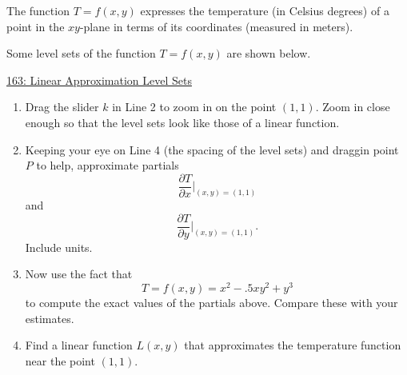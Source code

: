 \documentclass{ximera}
\begin{document}
\begin{question} \label{Q90f3mmrzx}
The function $T = f(x,y)$ expresses the temperature (in Celsius degrees) of a point in the $xy$-plane in terms of its coordinates (measured in meters).

Some level sets of the function $T=f(x,y)$ are shown below. 

\begin{onlineOnly}
    \begin{center}
\end{center}
\end{onlineOnly}

\href{https://www.desmos.com/calculator/lyquf7jmbb}{163: Linear Approximation Level Sets}

\begin{enumerate}
\item Drag the slider $k$ in Line 2 to zoom in on the point $(1,1)$. Zoom in close enough so that the level sets look like those of a linear function.

\item Keeping your eye on Line 4 (the spacing of the level sets) and draggin point $P$ to help, approximate partials
\[
   \frac{\partial T}{\partial x}\Big|_{(x,y) = (1,1)}
\]
and
\[
   \frac{\partial T}{\partial y}\Big|_{(x,y) = (1,1)} .
\]
Include units.

\item Now use the fact that 
\[
    T =f(x,y) = x^{2}-.5xy^{2}+y^{3}
\]
to compute the exact values of the partials above. Compare these with your estimates.

\item Find a linear function $L(x,y)$ that approximates the temperature function near the point $(1,1)$. 
\end{enumerate}

\end{question}
\end{document}
